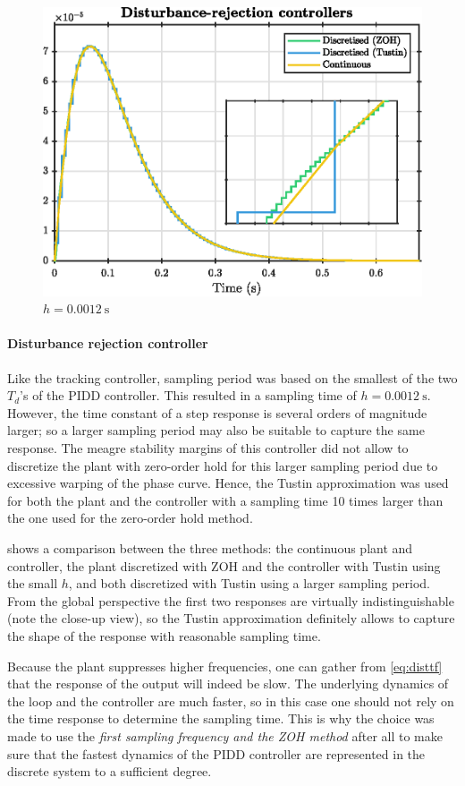 \begin{figure}[ht]
    \centering
    \includegraphics[]{media/q4/dt_distrej.eps}
    \caption{$h = \SI{0.0012}{\second}$}
    \label{fig:q4_dt_distrej}
\end{figure}
\paragraph{Disturbance rejection controller}
Like the tracking controller, sampling period was based on the smallest of the two $T_d$'s of the PIDD controller. This resulted in a sampling time of $h = \SI{0.0012}{\second}$. However, the time constant of a step response is several orders of magnitude larger; so a larger sampling period may also be suitable to capture the same response. The meagre stability margins of this controller did not allow to discretize the plant with zero-order hold for this larger sampling period due to excessive warping of the phase curve. Hence, the Tustin approximation was used for both the plant and the controller with a sampling time 10 times larger than the one used for the zero-order hold method. 

 shows a comparison between the three methods: the continuous plant and controller, the plant discretized with ZOH and the controller with Tustin using the small $h$, and both discretized with Tustin using a larger sampling period. From the global perspective the first two responses are virtually indistinguishable (note the close-up view), so the Tustin approximation definitely allows to capture the shape of the response with reasonable sampling time. 

Because the plant suppresses higher frequencies, one can gather from \cref{eq:disttf} that the response of the output will indeed be slow. The underlying dynamics of the loop and the controller are much faster, so in this case one should not rely on the time response to determine the sampling time. This is why the choice was made to use the \textit{first sampling frequency and the ZOH method} after all to make sure that the fastest dynamics of the PIDD controller are represented in the discrete system to a sufficient degree. 